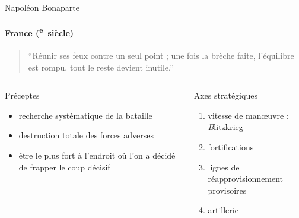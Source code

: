 \documentclass[utf8]{beamer}
\newcommand{\cRM}[1]{\MakeUppercase{\romannumeral #1}}  %
\newcommand{\siecle}[1]{\cRM{#1}\textsuperscript{e}~siècle}
\begin{document}
\begin{frame}{Napoléon Bonaparte}
\framesubtitle{France (\siecle{18})}
\begin{quote}“Réunir ses feux contre un seul point ; une fois la brèche faite, l’équilibre est rompu, tout le reste devient inutile.”\end{quote}
\vfill
\begin{columns}[t]
\begin{column}{0.5\linewidth}
Préceptes
\begin{itemize}
\item recherche systématique de la bataille
\item destruction totale des forces adverses
\item être le plus fort à l’endroit où l’on a décidé de frapper le coup décisif
\end{itemize}
\end{column}
\begin{column}{0.5\linewidth}
Axes stratégiques
\begin{enumerate}
\item vitesse de manœuvre : {\emph Blitzkrieg}
\item fortifications
\item lignes de réapprovisionnement provisoires
\item artillerie
\end{enumerate}
\end{column}
\end{columns}
\end{frame}
\end{document}
